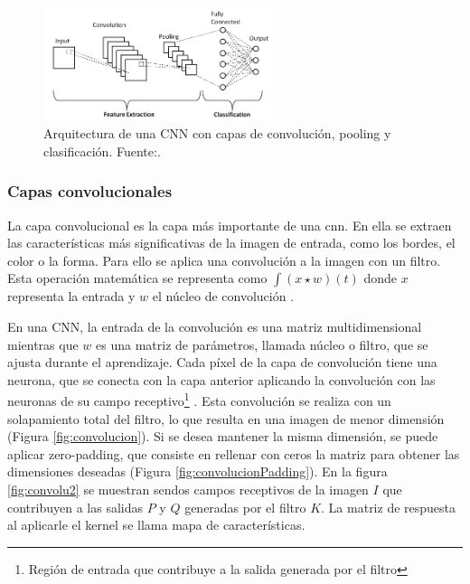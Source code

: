 \begin{figure}[h]
    \centering
    \includegraphics[width=0.6\textwidth]{img/convlayers.png}
    \caption{Arquitectura de una CNN con capas de convolución, pooling y clasificación. Fuente:\citep{phung2018deep}.}
    \label{fig:cnn_architecture}
\end{figure}

\subsubsection*{Capas convolucionales}

La capa convolucional es la capa más importante de una \acrshort{cnn}. En ella se extraen las características más significativas de la imagen de entrada, como los bordes, el color o la forma. Para ello se aplica una convolución a la imagen con un filtro. Esta operación matemática se representa como \( \int (x \star w)(t) \) donde $x$ representa la entrada y $w$ el núcleo de convolución \citep{pajares2021aprendizaje}.



En una CNN, la entrada de la convolución es una matriz multidimensional mientras que $w$ es una matriz de parámetros, llamada núcleo o filtro, que se ajusta durante el aprendizaje.
Cada píxel de la capa de convolución tiene una neurona, que se conecta con la capa anterior aplicando la convolución con las neuronas de su campo receptivo\footnote{Región de entrada que contribuye a la salida generada por el filtro} \cite{geron2022hands}. Esta convolución se realiza con un solapamiento total del filtro, lo que resulta en una imagen de menor dimensión (Figura \ref{fig:convolucion}). Si se desea mantener la misma dimensión, se puede aplicar zero-padding, que consiste en rellenar con ceros la matriz para obtener las dimensiones deseadas (Figura \ref{fig:convolucionPadding}). En la figura \ref{fig:convolu2} se muestran sendos campos receptivos de la imagen \( I \) que contribuyen a las salidas \( P \) y \( Q \) generadas por el filtro \( K \). La matriz de respuesta al aplicarle el kernel se llama mapa de características.

